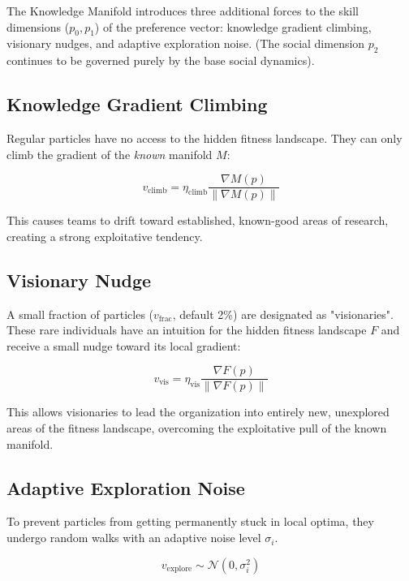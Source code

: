 \documentclass[11pt,a4paper]{article}
\begin{document}
The Knowledge Manifold introduces three additional forces to the skill dimensions ($p_0, p_1$) of the preference vector: knowledge gradient climbing, visionary nudges, and adaptive exploration noise. (The social dimension $p_2$ continues to be governed purely by the base social dynamics).

\subsection{Knowledge Gradient Climbing}

Regular particles have no access to the hidden fitness landscape. They can only climb the gradient of the \textit{known} manifold $M$:

\begin{equation}
v_{\text{climb}} = \eta_{\text{climb}} \frac{\nabla M(p)}{\|\nabla M(p)\|}
\end{equation}

This causes teams to drift toward established, known-good areas of research, creating a strong exploitative tendency.

\subsection{Visionary Nudge}

A small fraction of particles ($v_{\text{frac}}$, default 2\%) are designated as "visionaries". These rare individuals have an intuition for the hidden fitness landscape $F$ and receive a small nudge toward its local gradient:

\begin{equation}
v_{\text{vis}} = \eta_{\text{vis}} \frac{\nabla F(p)}{\|\nabla F(p)\|}
\end{equation}

This allows visionaries to lead the organization into entirely new, unexplored areas of the fitness landscape, overcoming the exploitative pull of the known manifold.

\subsection{Adaptive Exploration Noise}

To prevent particles from getting permanently stuck in local optima, they undergo random walks with an adaptive noise level $\sigma_i$. 

\begin{equation}
v_{\text{explore}} \sim \mathcal{N}(0, \sigma_i^2)
\end{equation}
\end{document}
